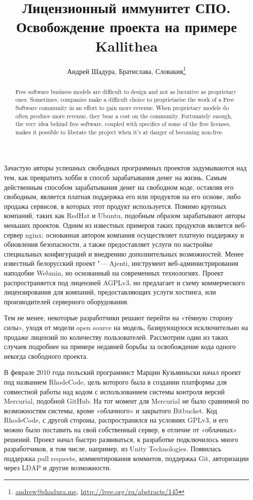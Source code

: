 \documentclass[10pt, a5paper]{article}
\begin{document}
\title{Лицензионный иммунитет СПО. Освобождение проекта на примере Kallithea}
\author{Андрей Шадура, Братислава, Словакия\footnote{\url{andrew@shadura.me}, \url{http://lvee.org/ru/abstracts/145}}}
\maketitle
\begin{abstract}
Free software business models are difficult to design and not as lucrative as proprietary ones. Sometimes, companies make a difficult                choice to proprietarise the work of a Free Software community in an effort to gain more revenue. When proprietary models do often produce more revenue, they bear a cost on the community. Fortunately enough, the very idea behind free software, coupled with specifics of some of the free licenses, makes it possible to liberate the project when it's at danger of becoming non-free.
\end{abstract}
Зачастую авторы успешных свободных программных проектов задумываются над тем, как превратить хобби в способ зарабатывания денег на жизнь. Самым действенным способом зарабатывания денег на свободном коде, оставляя его свободным, является платная поддержка его или продуктов на его основе, либо продажа сервисов, в которых этот продукт используется. Помимо крупных компаний, таких как RedHat и Ubuntu, подобным образом зарабатывают авторы меньших проектов. Одним из известных примеров таких продуктов является веб-сервер nginx: основанная автором компания осуществляет платную поддержку и обновления безопасности, а также предоставляет услуги по настройке специальных конфигураций и внедрению дополнительных возможностей. Менее известный белорусский проект "--- Ajenti, инструмент веб-администрирования наподобие Webmin, но основанный на современных технологиях. Проект распространяется под лицензией AGPLv3, но предлагает и схему коммерческого лицензирования для компаний, предоставляющих услуги хостинга, или производителей серверного оборудования.

Тем не менее, некоторые разработчики решают перейти на «тёмную сторону силы», уходя от модели open source на модель, базирующуюся исключительно на продаже лицензий по количеству пользователей. Рассмотрим один из таких случаев подробнее на примере недавней борьбы за освобождение кода одного некогда свободного проекта.

В феврале 2010 года польский программист Марцин Кузьминьски начал проект под названием RhodeCode, цель которого была в создании платформы для совместной работы над кодом с использованием системы контроля версий Mercurial, подобной GitHub. На тот момент для Mercurial не было сравнимой по возможностям системы, кроме «облачного» и закрытого Bitbucket. Код RhodeCode, с другой стороны, распространялся на условиях GPLv3, и его можно было поставить на свой собственный сервер, в отличие от «облачных» решений. Проект начал быстро развиваться, к разработке подключилось много разработчиков, в том числе, например, из Unity Technologies. Появилась поддержка pull requests, комментирования коммитов, поддержка Git, авторизации через LDAP и другие возможности.
\end{document}
